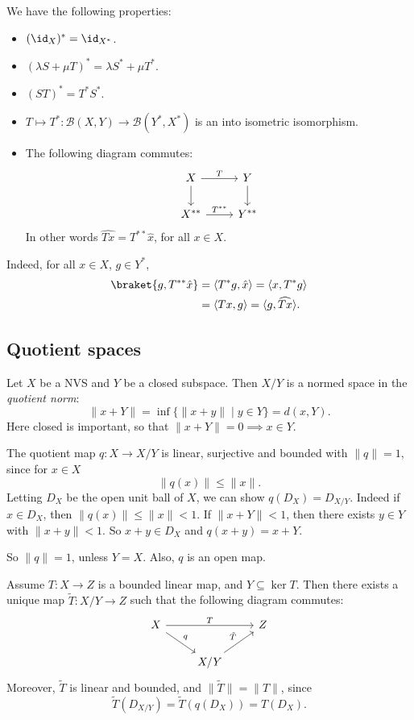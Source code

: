 \documentclass[12pt]{article}
\begin{document}
We have the following properties:
\begin{itemize}
	\item $(\id_X)^\ast = \id_{X^\ast}$.
	\item $(\lambda S + \mu T)^\ast = \lambda S^\ast + \mu T^\ast$.
	\item $(ST)^\ast = T^\ast S^\ast$.
	\item $T \mapsto T^\ast : \mathcal{B}(X, Y) \to \mathcal{B}(Y^\ast, X^\ast)$ is an into isometric isomorphism.
	\item The following diagram commutes:
		\[
		\begin{tikzcd}
			X \arrow[r, "T"] \arrow[d] & Y \arrow[d] \\
			X^{\ast\ast} \arrow[r, "T^{\ast\ast}"] & Y^{\ast\ast}
		\end{tikzcd}
		\]
		In other words $\widehat{T x} = T^{\ast\ast} \hat x$, for all $x \in X$.
\end{itemize}

Indeed, for all $x \in X$, $g \in Y^\ast$,
\begin{align*}
	\braket{g, T^{\ast\ast} \hat x} &= \langle T^{\ast} g, \hat x \rangle = \langle x, T^{\ast} g\rangle \\
					       &= \langle Tx, g\rangle = \langle g, \widehat{Tx}\rangle.
\end{align*}

\subsection{Quotient spaces}%
\label{sub:qp}

Let $X$ be a NVS and $Y$ be a closed subspace. Then $X/Y$ is a normed space in the \emph{quotient norm}:
\[
	\|x + Y\| = \inf\{ \|x + y\| \mid y \in Y\} = d(x, Y).
\]
Here closed is important, so that $\|x + Y\| = 0 \implies x \in Y$.

The quotient map $q : X \to X/Y$ is linear, surjective and bounded with $\|q\| = 1$, since for $x \in X$ 
\[
\|q(x)\| \leq \|x\|.
\]
Letting $D_X$ be the open unit ball of $X$, we can show $q(D_X) = D_{X/Y}$. Indeed if $x \in D_X$, then $\|q(x)\| \leq \|x\| < 1$. If $\|x + Y\| < 1$, then there exists $y \in Y$ with $\|x + y\| < 1$. So $x + y \in D_X$ and $q(x + y) = x + Y$.

So $\|q\| = 1$, unless $Y = X$. Also, $q$ is an open map.

Assume $T : X \to Z$ is a bounded linear map, and $Y \subseteq \ker T$. Then there exists a unique map $\tilde T : X/Y \to Z$ such that the following diagram commutes:
\[
\begin{tikzcd}
	X \arrow[rr, "T"] \arrow[dr, "q"] & & Z \\
					  & X/Y \arrow[ur, "\tilde T"] &
\end{tikzcd}
\]
Moreover, $\tilde T$ is linear and bounded, and $\|\tilde T\| = \|T\|$, since
\[
\tilde T(D_{X/Y}) = \tilde T(q(D_X)) = T(D_X).
\]
\end{document}
